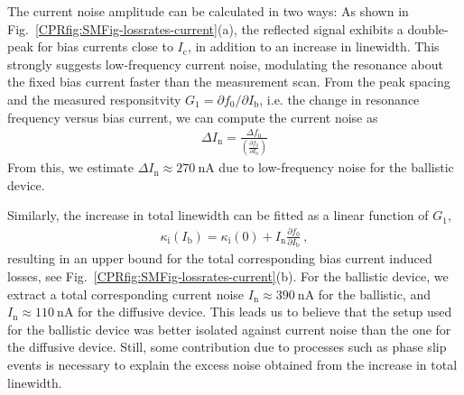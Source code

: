 The current noise amplitude can be calculated in two ways:
%
As shown in Fig.~\ref{CPRfig:SMFig-lossrates-current}(a), the reflected signal exhibits a double-peak for bias currents close to $I_\text{c}$, in addition to an increase in linewidth.
%
This strongly suggests low-frequency current noise, modulating the resonance about the fixed bias current faster than the measurement scan.
%
From the peak spacing and the measured responsitvity $G_1=\partial f_0/\partial I_\text{b}$, i.e. the change in resonance frequency versus bias current, we can compute the current noise as
\begin{align}
\Delta I_\text{n} = \frac{\Delta f_0}{\left( \frac{\partial f_0}{\partial I_\text{b}} \right)}
\label{CPReq:currnoise-a}
\end{align}
%
From this, we estimate $\Delta I_\text{n}\approx\SI{270}{\nano\ampere}$ due to low-frequency noise for the ballistic device.


Similarly, the increase in total linewidth can be fitted as a linear function of $G_1$, 
%
\begin{align}
\kappa_\text{i}(I_\text{b})=\kappa_\text{i}(0)+I_\text{n} \frac{\partial f_0}{\partial I_\text{b}} \ ,
\label{CPReq:currnoise-b}
\end{align}
%
resulting in an upper bound for the total corresponding bias current induced losses, see Fig.~\ref{CPRfig:SMFig-lossrates-current}(b).
%
For the ballistic device, we extract a total corresponding current noise $I_\text{n}\approx\SI{390}{\nano\ampere}$ for the ballistic, and $I_\text{n}\approx\SI{110}{\nano\ampere}$ for the diffusive device.
%
This leads us to believe that the setup used for the ballistic device was better isolated against current noise than the one for the diffusive device.
%
Still, some contribution due to processes such as phase slip events is necessary to explain the excess noise obtained from the increase in total linewidth.

